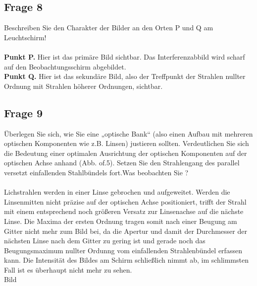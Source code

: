 \documentclass[a4paper,10pt]{scrartcl}
\begin{document}
	\subsection{Frage 8}
		Beschreiben Sie den Charakter der Bilder an den Orten P und Q am Leuchtschirm!
		\\
		\\
		\textbf{Punkt P.} Hier ist das primäre Bild sichtbar. Das Interferenzabbild wird scharf auf den Beobachtungsschirm abgebildet.\\
		\textbf{Punkt Q.} Hier ist das sekundäre Bild, also der Treffpunkt der Strahlen nullter Ordnung mit Strahlen höherer Ordnungen, sichtbar.
	\subsection{Frage 9}
		Überlegen Sie sich, wie Sie eine „optische Bank“ (also einen Aufbau mit mehreren optischen Komponenten wie z.B. Linsen) justieren sollten. Verdeutlichen Sie sich die Bedeutung einer optimalen Ausrichtung der optischen Komponenten auf der optischen Achse anhand (Abb. of.5). Setzen Sie den Strahlengang des parallel versetzt einfallenden Stahlbündels fort.Was beobachten Sie ?
		\\
		\\
		Lichstrahlen werden in einer Linse gebrochen und aufgeweitet. Werden die Linsenmitten nicht präzise auf der optischen Achse positioniert, trifft der Strahl mit einem entsprechend noch größeren Versatz zur Linsenachse auf die nächste Linse. Die Maxima der ersten Ordnung tragen somit nach einer Beugung am Gitter nicht mehr zum Bild bei, da die Apertur und damit der Durchmesser der nächsten Linse nach dem Gitter zu gering ist und gerade noch das Beugungsmaximum nullter Ordunng vom einfallenden Strahlenbündel erfassen kann. Die Intensität des Bildes am Schirm schließlich nimmt ab, im schlimmsten Fall ist es überhaupt nicht mehr zu sehen.
		\\
		Bild
			
\end{document}
